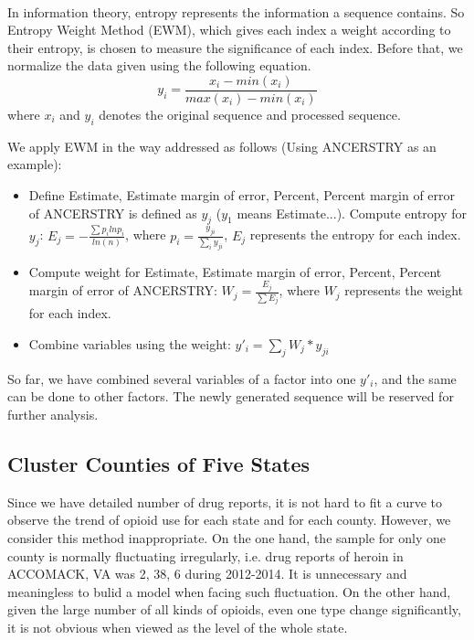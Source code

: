 \documentclass[11pt]{article}
\newcommand{\upcite}[1]{\textsuperscript{\textsuperscript{\cite{#1}}}}
\begin{document}
In information theory, entropy represents the information a sequence contains\upcite{3}. So Entropy Weight Method (EWM), which gives each index a weight according to their entropy, is chosen to measure the significance of each index. Before that, we normalize the data given using the following equation.
\begin{equation}
	y_{i} = \frac{x_{i}-min(x_{i})}{max(x_{i}) - min(x_{i})}
\end{equation}
where $x_{i}$ and $y_{i}$ denotes the original sequence and processed sequence.

We apply EWM in the way addressed as follows (Using ANCERSTRY as an example):
\begin{itemize}
	\item Define Estimate, Estimate margin of error, Percent, Percent margin of error of ANCERSTRY is defined as $y_{j}$ ($y_{1}$ means Estimate...). Compute entropy for $y_{j}$: $ E_{j} = -\frac{\sum p_{i}lnp_{i}}{ln(n)}$, where $p_{i}=\frac{y_{ji}}{\sum_{i} y_{ji}}$, $E_{j}$ represents the entropy for each index.
	\item Compute weight for Estimate, Estimate margin of error, Percent, Percent margin of error of ANCERSTRY: $ W_{j} = \frac{E_{j}}{\sum E_{j}}$, where $W_{j}$ represents the weight for each index.
	\item Combine variables using the weight: $y'_{i} = \sum_{j} W_{j} * y_{ji}$
\end{itemize}
So far, we have combined several variables of a factor into one $y'_{i}$, and the same can be done to other factors. The newly generated sequence will be reserved for further analysis.

\subsection{Cluster Counties of Five States}
Since we have detailed number of drug reports, it is not hard to fit a curve to observe the trend of opioid use for each state and for each county. However, we consider this method inappropriate. On the one hand, the sample for only one county is normally fluctuating irregularly, i.e. drug reports of heroin in ACCOMACK, VA was 2, 38, 6 during 2012-2014. It is unnecessary and meaningless to bulid a model when facing such fluctuation. On the other hand, given the large number of all kinds of opioids, even one type change significantly, it is not obvious when viewed as the level of the whole state.
\end{document}

